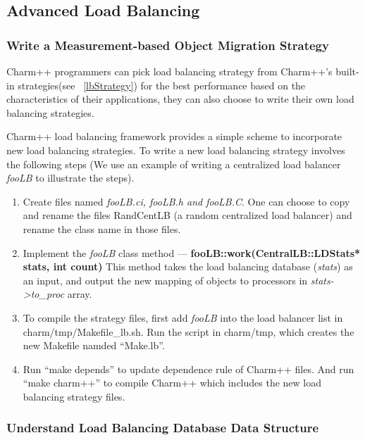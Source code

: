 
\subsection{Advanced Load Balancing}
\label{advancedlb}

\subsubsection{Write a Measurement-based Object Migration Strategy}
\label{writelb}

Charm++ programmers can pick load balancing strategy from Charm++'s built-in
strategies(see ~\ref{lbStrategy}) for the best performance based on the 
characteristics of their applications, they can also choose to write their 
own load balancing strategies.

Charm++ load balancing framework provides a simple scheme to incorporate new 
load balancing strategies. To write a new load balancing strategy
involves the following steps (We use an example of writing a centralized
load balancer {\em fooLB} to illustrate the steps).

\begin{enumerate}
\item Create files named {\em fooLB.ci, fooLB.h and fooLB.C}. One can choose to
copy and rename the files RandCentLB (a random centralized load balancer) and 
rename the class name in those files.

\item Implement the {\em fooLB} class method --- 
{\bf fooLB::work(CentralLB::LDStats* stats, int count)} 
This method takes the load balancing database ({\em stats}) as an input,
and output the new mapping of objects to processors in {\em stats->to\_proc} array.

\item To compile the strategy files, first add {\em fooLB} into the load 
balancer list in charm/tmp/Makefile\_lb.sh. Run the script in charm/tmp, 
which creates the new Makefile namded ``Make.lb''.

\item Run ``make depends'' to update dependence rule of Charm++ files.
   And run ``make charm++'' to compile Charm++ which includes the new 
load balancing strategy files.
\end{enumerate}


\subsubsection{Understand Load Balancing Database Data Structure}
\label{lbdatabase}

